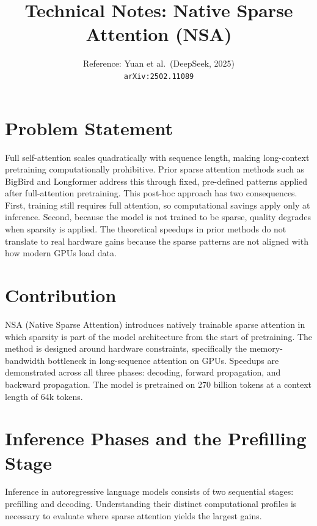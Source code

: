 \documentclass[11pt,letterpaper]{article}
\title{\textbf{Technical Notes: Native Sparse Attention (NSA)}}
\author{Reference: Yuan et al.\ (DeepSeek, 2025)\\
        \small\texttt{arXiv:2502.11089}}
\date{}
\begin{document}
\maketitle

\section{Problem Statement}

Full self-attention scales quadratically with sequence length, making long-context pretraining
computationally prohibitive. Prior sparse attention methods such as BigBird and Longformer
address this through fixed, pre-defined patterns applied after full-attention pretraining. This
post-hoc approach has two consequences. First, training still requires full attention, so
computational savings apply only at inference. Second, because the model is not trained to be
sparse, quality degrades when sparsity is applied. The theoretical speedups in prior methods do
not translate to real hardware gains because the sparse patterns are not aligned with how modern
GPUs load data.

\section{Contribution}

NSA (Native Sparse Attention) introduces natively trainable sparse attention in which sparsity
is part of the model architecture from the start of pretraining. The method is designed around
hardware constraints, specifically the memory-bandwidth bottleneck in long-sequence attention on
GPUs. Speedups are demonstrated across all three phases: decoding, forward propagation, and
backward propagation. The model is pretrained on 270 billion tokens at a context length of 64k
tokens.

\section{Inference Phases and the Prefilling Stage}

Inference in autoregressive language models consists of two sequential stages: prefilling and
decoding. Understanding their distinct computational profiles is necessary to evaluate where
sparse attention yields the largest gains.
\end{document}

